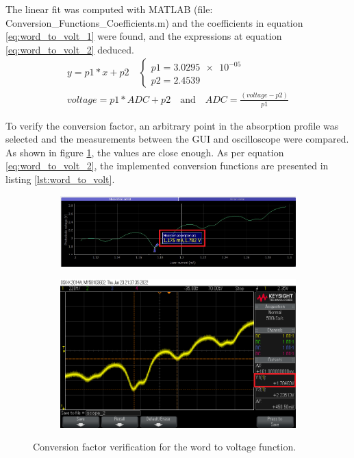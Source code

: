 \documentclass[a4paper,12pt]{article}
\begin{document}
The linear fit was computed with MATLAB (file: Conversion\_Functions\_Coefficients.m) and the coefficients in equation \ref{eq:word_to_volt_1} were found, and the expressions at equation \ref{eq:word_to_volt_2} deduced.
\begin{align}
y=p1*x+p2\quad
\begin{cases}
p1=\SI{3.0295e-05}{}\\ p2=2.4539
\end{cases}
\label{eq:word_to_volt_1}
\\voltage=p1*ADC+p2 \quad\text{and}\quad ADC=\frac{(voltage-p2)}{p1}
\label{eq:word_to_volt_2}
\end{align}

To verify the conversion factor, an arbitrary point in the absorption profile was selected and the measurements between the GUI and oscilloscope were compared. As shown in figure \ref{fig:word_to_volt_ver}, the values are close enough. 
As per equation \ref{eq:word_to_volt_2}, the implemented conversion functions are presented in listing \ref{lst:word_to_volt}.

\begin{figure}[!h]
\centering
\begin{subfigure}[b]{0.85\textwidth}
	\centering
	\includegraphics[width=\textwidth]{Images/word_to_volt_ver_1.png}
	\captionsetup{justification=centering}
\end{subfigure}
\newline
\begin{subfigure}[b]{0.85\textwidth}
	\centering
	\includegraphics[width=\textwidth]{Images/word_to_volt_ver_2.png}
	\captionsetup{justification=centering}
\end{subfigure}
 \caption{Conversion factor verification for the word to voltage function.}
\label{fig:word_to_volt_ver}
\end{figure}
\end{document}
